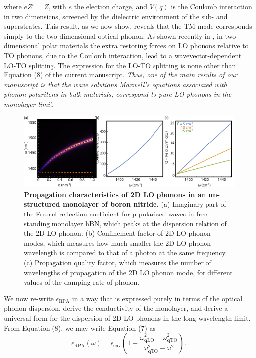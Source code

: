 \documentclass[aps,prb,twocolumn,
groupedaddress,superscriptaddress,
amsfonts,amssymb,amsmath,floatfix,
citeautoscript]{revtex4-1}
\begin{document}
	where $eZ^r = Z$, with $e$ the electron charge, and $V(q)$ is the Coulomb interaction in two dimensions, screened by the dielectric environment of the sub- and superstrates. This result, as we now show, reveals that the TM mode corresponds simply to the two-dimensional optical phonon. As shown recently in \cite{sohier2017breakdown}, in two-dimensional polar materials the extra restoring forces on LO phonons relative to TO phonons, due to the Coulomb interaction, lead to a wavevector-dependent LO-TO splitting. The expression for the LO-TO splitting is none other than Equation (8) of the current manuscript. \textit{Thus, one of the main results of our manuscript is that the wave solutions Maxwell's equations associated with phonon-polaritons in bulk materials, correspond to pure LO phonons in the monolayer limit.} 
	\begin{figure}[t]
		\includegraphics[width=135mm]{fig2.pdf}
		\caption{\textbf{Propagation characteristics of 2D LO phonons in an un-structured monolayer of boron nitride.} (a) Imaginary part of the Fresnel reflection coefficient for p-polarized waves in free-standing monolayer hBN, which peaks at the dispersion relation of the 2D LO phonon. (b) Confinement factor of 2D LO phonon modes, which measures how much smaller the 2D LO phonon wavelength is compared to that of a photon at the same frequency. (c) Propagation quality factor, which measures the number of wavelengths of propagation of the 2D LO phonon mode, for different values of the damping rate of phonon.}
	\end{figure}
	We now re-write $\epsilon_{\mathrm{RPA}}$ in a way that is expressed purely in terms of the optical phonon dispersion, derive the conductivity of the monolayer, and derive a universal form for the dispersion of 2D LO phonons in the long-wavelength limit. From Equation (8), we may write Equation (7) as
	\begin{equation}
	\epsilon_{\mathrm{RPA}}(\omega) = \epsilon_{\mathrm{env}}\left( 1 + \frac{\omega^2_{\mathbf{q}\mathrm{LO}}-\omega^2_{\mathbf{q}\mathrm{TO}}}{\omega^2_{\mathbf{q}\mathrm{TO}}-\omega^2}\right).
	\end{equation}
\end{document}
